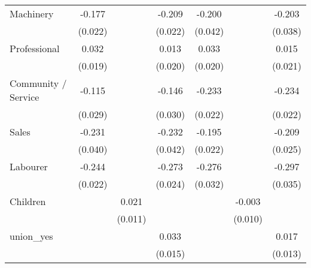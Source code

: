 {\begin{tabular}{l*{6}{c}}
Machinery           &      -0.177\sym{***}&                     &      -0.209\sym{***}&      -0.200\sym{***}&                     &      -0.203\sym{***}\\
                    &     (0.022)         &                     &     (0.022)         &     (0.042)         &                     &     (0.038)         \\
Professional        &       0.032\sym{*}  &                     &       0.013         &       0.033         &                     &       0.015         \\
                    &     (0.019)         &                     &     (0.020)         &     (0.020)         &                     &     (0.021)         \\
Community / Service &      -0.115\sym{***}&                     &      -0.146\sym{***}&      -0.233\sym{***}&                     &      -0.234\sym{***}\\
                    &     (0.029)         &                     &     (0.030)         &     (0.022)         &                     &     (0.022)         \\
Sales               &      -0.231\sym{***}&                     &      -0.232\sym{***}&      -0.195\sym{***}&                     &      -0.209\sym{***}\\
                    &     (0.040)         &                     &     (0.042)         &     (0.022)         &                     &     (0.025)         \\
Labourer            &      -0.244\sym{***}&                     &      -0.273\sym{***}&      -0.276\sym{***}&                     &      -0.297\sym{***}\\
                    &     (0.022)         &                     &     (0.024)         &     (0.032)         &                     &     (0.035)         \\
Children            &                     &       0.021\sym{*}  &                     &                     &      -0.003         &                     \\
                    &                     &     (0.011)         &                     &                     &     (0.010)         &                     \\
union\_yes           &                     &                     &       0.033\sym{**} &                     &                     &       0.017         \\
                    &                     &                     &     (0.015)         &                     &                     &     (0.013)         \\

\end{tabular}}
